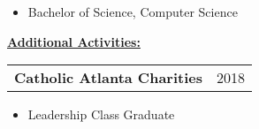 \documentclass{book}
\newenvironment{myitemize}
{ \begin{itemize}
	\setlength{\itemsep}{0pt}
	\setlength{\parskip}{0pt}
	\setlength{\parsep}{0pt}     }
{ \end{itemize}                  }
\begin{document}
\begin{myitemize}

	\item Bachelor of Science, Computer Science 

\end{myitemize}

\underline{\Large {\bfseries Additional Activities:}}

\enspace

\begin{tabular}{L{4.75in}R{1.75in}}

	{\large {\bfseries Catholic Atlanta Charities}} & 2018\\

\end{tabular}

	\vspace{-\topsep}

	\begin{myitemize}

		\item Leadership Class Graduate

	\end{myitemize}
\end{document}
